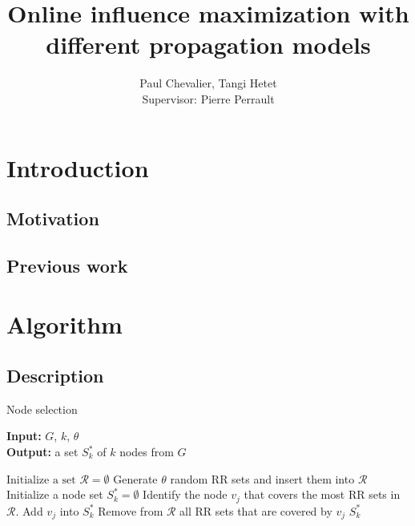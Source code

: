 \documentclass[a4paper,10pt]{article}
\title{Online influence maximization with different propagation models}
\author{Paul Chevalier, Tangi Hetet\\[0.5cm]{Supervisor: Pierre Perrault}}
\begin{document}
\maketitle

\begin{abstract}

\end{abstract}

\section{Introduction}

\subsection{Motivation}

\subsection{Previous work}

\section{Algorithm}

\subsection{Description}

\begin{algorithm}
\caption{Node selection}\label{alg:oracle}
\hspace*{\algorithmicindent} \textbf{Input: } $G$, $k$, $\theta$\\
\hspace*{\algorithmicindent} \textbf{Output: } a set $S_k^*$ of $k$ nodes from $G$
\begin{algorithmic}[1]
\State $\text{Initialize a set } \mathcal{R} = \emptyset$
\State Generate $\theta$ random RR sets and insert them into $\mathcal{R}$
\State Initialize a node set $S_k^* = \emptyset$
\State Identify the node $v_j$ that covers the most RR sets in $\mathcal{R}$.
\State Add $v_j$ into $S_k^*$
\State Remove from $\mathcal{R}$ all RR sets that are covered by $v_j$
\EndFor
\State\Return $S_k^*$
\end{algorithmic}
\end{algorithm}
\end{document}
